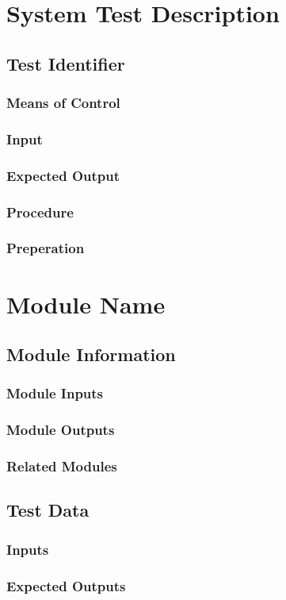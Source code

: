 \documentclass[12pt]{article}
\begin{document}
\section{System Test Description}


\subsection{Test Identifier}

\subsubsection{Means of Control}

\subsubsection{ Input}


\subsubsection{ Expected Output}


\subsubsection{Procedure}

\subsubsection{Preperation}


%
%
\section{Module Name}


\subsection{Module Information}


\subsubsection{Module Inputs}


\subsubsection{Module Outputs}


\subsubsection{Related Modules}


\subsection{Test Data}


\subsubsection{Inputs}


\subsubsection{Expected Outputs}
\end{document}
